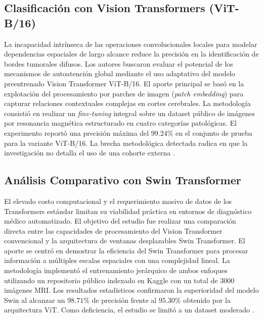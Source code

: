 \subsection{Clasificación con Vision Transformers (ViT-B/16)}
La incapacidad intrínseca de las operaciones convolucionales locales para modelar dependencias espaciales de largo alcance reduce la precisión en la identificación de bordes tumorales difusos. Los autores buscaron evaluar el potencial de los mecanismos de autoatención global mediante el uso adaptativo del modelo preentrenado Vision Transformer ViT-B/16. El aporte principal se basó en la explotación del procesamiento por parches de imagen (\textit{patch embedding}) para capturar relaciones contextuales complejas en cortes cerebrales. La metodología consistió en realizar un \textit{fine-tuning} integral sobre un dataset público de imágenes por resonancia magnética estructurado en cuatro categorías patológicas. El experimento reportó una precisión máxima del $99.24\%$ en el conjunto de prueba para la variante ViT-B/16. La brecha metodológica detectada radica en que la investigación no detalla el uso de una cohorte externa \cite{Panigrahi2025}.

\subsection{Análisis Comparativo con Swin Transformer}
El elevado costo computacional y el requerimiento masivo de datos de los Transformers estándar limitan su viabilidad práctica en entornos de diagnóstico médico automatizado. El objetivo del estudio fue realizar una comparación directa entre las capacidades de procesamiento del Vision Transformer convencional y la arquitectura de ventanas desplazables Swin Transformer. El aporte se centró en demostrar la eficiencia del Swin Transformer para procesar información a múltiples escalas espaciales con una complejidad lineal. La metodología implementó el entrenamiento jerárquico de ambos enfoques utilizando un repositorio público indexado en Kaggle con un total de 3000 imágenes MRI. Los resultados estadísticos confirmaron la superioridad del modelo Swin al alcanzar un $98.71\%$ de precisión frente al $95.30\%$ obtenido por la arquitectura ViT. Como deficiencia, el estudio se limitó a un dataset moderado \cite{Jain2025}.

